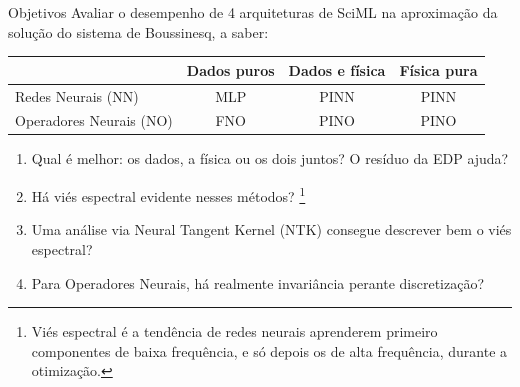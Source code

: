 \begin{frame}{Objetivos}
  Avaliar o desempenho de 4 arquiteturas de SciML na aproximação da solução do sistema de Boussinesq, a saber:
  \vspace{4pt}
  \begin{center}
    \begin{tabular}{@{}lccc@{}}
      \toprule
       & \textbf{Dados puros} & \textbf{Dados e física} & \textbf{Física pura} \\
      \midrule
      Redes Neurais (NN)         & MLP  & PINN & PINN \\
      Operadores Neurais (NO)   & FNO  & PINO & PINO \\
      \bottomrule
    \end{tabular}
  \end{center}
  \begin{enumerate}[<+->]
    \item Qual é melhor: os dados, a física ou os dois juntos? O resíduo da EDP ajuda?
    \item Há viés espectral evidente nesses métodos? \footnote{\textcolor{AmurmapleRed}{Viés espectral é a tendência de redes neurais aprenderem primeiro componentes de baixa frequência, e só depois os de alta frequência, durante a otimização.}}
    \item Uma análise via Neural Tangent Kernel (NTK) consegue descrever bem o viés espectral?
    \item Para Operadores Neurais, há realmente invariância perante discretização?
  \end{enumerate}
\end{frame}
